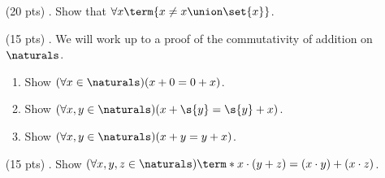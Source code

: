 \begin{enumerate}
\begin{mdframed}
\begin{proof}
\begin{case}
          Let $\ell, r \in P$.
          If $\ell \in L \land r \in L$, then $\alpha(\ell) = \alpha(r)$.
          Similarly, if $\ell \in R \land r \in R$, then $\alpha(\ell) = \alpha(r)$.
          Now, suppose $\ell \in L \land r \in R$.
          \begin{equation*}
            \alpha(\ell) = \alpha(p_1) = \alpha(p_2) = \alpha(p_{k + 1}) = \alpha(r)
          \end{equation*}
          So, all people in $P$ have the same age.
        \end{case}

        Therefore, everyone on Earth has the same age.
      \end{proof}
    \end{mdframed}

  \item[(20 pts) \quad 2.]
    Show that $\forall x \term{x \neq x \union \set{x}}$.

  \item[(15 pts) \quad 3.]
    We will work up to a proof of the commutativity of addition on $\naturals$.
    \begin{enumerate}
      \item
        Show $(\forall x \in \naturals)(x + 0 = 0 + x)$.
      \item
        Show $(\forall x, y \in \naturals)(x + \s{y} = \s{y} + x)$.
      \item
        Show $(\forall x, y \in \naturals)(x + y = y + x)$.
    \end{enumerate}

  \item[(15 pts) \quad 4.]
    Show $(\forall x, y, z \in \naturals)\term*{x \cdot (y + z) = (x \cdot y) + (x \cdot z)}$.




\end{enumerate}
